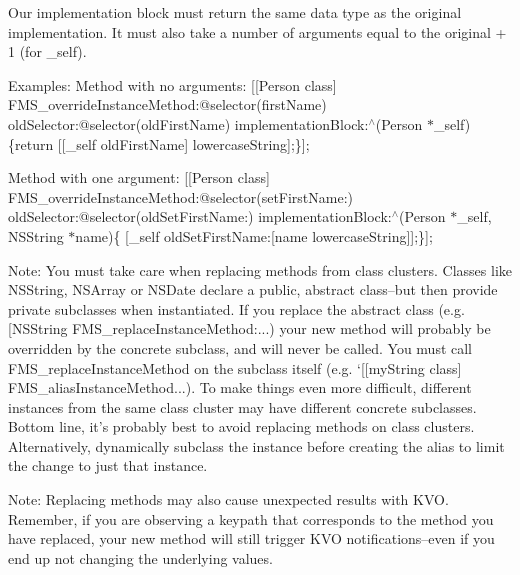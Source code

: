 Our implementation block must return the same data type as the original implementation. It must also take a number of arguments equal to the original + 1 (for {\ttfamily \-\_\-self}).

Examples\-: Method with no arguments\-: {\ttfamily \mbox{[}\mbox{[}Person class\mbox{]} F\-M\-S\-\_\-override\-Instance\-Method\-:@selector(first\-Name) old\-Selector\-:@selector(old\-First\-Name) implementation\-Block\-:$^\wedge$(Person $\ast$\-\_\-self)\{return \mbox{[}\mbox{[}\-\_\-self old\-First\-Name\mbox{]} lowercase\-String\mbox{]};\}\mbox{]};}

Method with one argument\-: {\ttfamily \mbox{[}\mbox{[}Person class\mbox{]} F\-M\-S\-\_\-override\-Instance\-Method\-:@selector(set\-First\-Name\-:) old\-Selector\-:@selector(old\-Set\-First\-Name\-:) implementation\-Block\-:$^\wedge$(Person $\ast$\-\_\-self, N\-S\-String $\ast$name)\{ \mbox{[}\-\_\-self old\-Set\-First\-Name\-:\mbox{[}name lowercase\-String\mbox{]}\mbox{]};\}\mbox{]};}

Note\-: You must take care when replacing methods from class clusters. Classes like N\-S\-String, N\-S\-Array or N\-S\-Date declare a public, abstract class--but then provide private subclasses when instantiated. If you replace the abstract class (e.\-g. {\ttfamily \mbox{[}N\-S\-String F\-M\-S\-\_\-replace\-Instance\-Method\-:...}) your new method will probably be overridden by the concrete subclass, and will never be called. You must call {\ttfamily F\-M\-S\-\_\-replace\-Instance\-Method} on the subclass itself (e.\-g. `\mbox{[}\mbox{[}my\-String class\mbox{]} F\-M\-S\-\_\-alias\-Instance\-Method...). To make things even more difficult, different instances from the same class cluster may have different concrete subclasses. Bottom line, it's probably best to avoid replacing methods on class clusters. Alternatively, dynamically subclass the instance before creating the alias to limit the change to just that instance.

Note\-: Replacing methods may also cause unexpected results with K\-V\-O. Remember, if you are observing a keypath that corresponds to the method you have replaced, your new method will still trigger K\-V\-O notifications--even if you end up not changing the underlying values.

